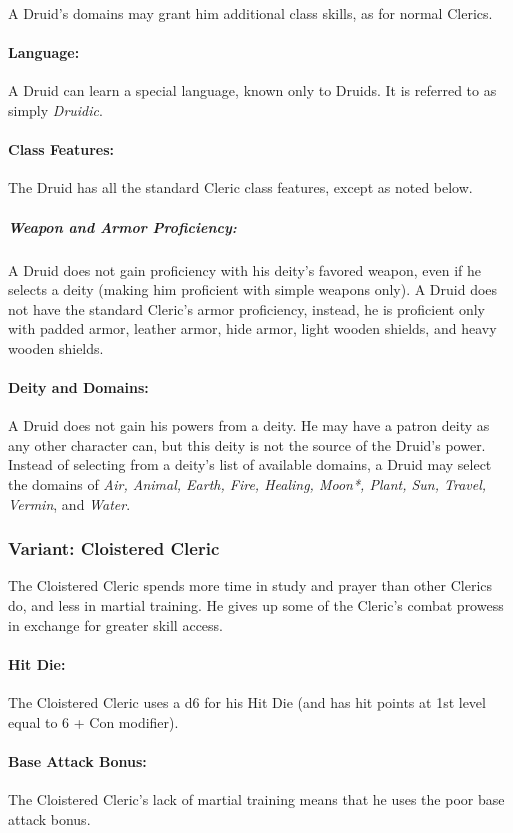 A Druid's domains may grant him additional class skills, as for normal Clerics.

\paragraph{Language:} A Druid can learn a special language, known only to Druids. It is referred to as simply \emph{Druidic}.

\paragraph{Class Features:}
The Druid has all the standard Cleric class features, except as noted below.
\subparagraph{Weapon and Armor Proficiency:} A Druid does not gain proficiency with his deity's favored weapon, even if he selects a deity (making him proficient with simple weapons only).
A Druid does not have the standard Cleric's armor proficiency, instead, he is proficient only with padded armor, leather armor, hide armor, light wooden shields, and heavy wooden shields.

\paragraph{Deity and Domains:} A Druid does not gain his powers from a deity. 
He may have a patron deity as any other character can, but this deity is not the source of the Druid's power.
Instead of selecting from a deity's list of available domains, a Druid may select the domains of \emph{Air, Animal, Earth, Fire, Healing, Moon*, Plant, Sun, Travel, Vermin}, and \emph{Water}.

\subsubsection{Variant: Cloistered Cleric}
The Cloistered Cleric spends more time in study and prayer than other Clerics do, and less in martial training. 
He gives up some of the Cleric's combat prowess in exchange for greater skill access.

\paragraph{Hit Die:}
The Cloistered Cleric uses a d6 for his Hit Die (and has hit points at 1st level equal to 6 + Con modifier).

\paragraph{Base Attack Bonus:}
The Cloistered Cleric's lack of martial training means that he uses the poor base attack bonus.

